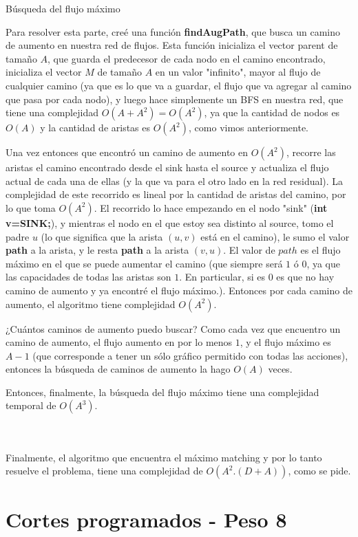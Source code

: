 \documentclass[a4paper]{article}
\begin{document}
\begin{subsubsection}{Búsqueda del flujo máximo} 

Para resolver esta parte, creé una función \textbf{findAugPath}, que busca un camino de aumento en nuestra red de flujos. Esta función inicializa el vector parent de tamaño $A$, que guarda el predecesor de cada nodo en el camino encontrado, inicializa el vector $M$ de tamaño $A$ en un valor "infinito", mayor al flujo de cualquier camino (ya que es lo que va a guardar, el flujo que va agregar al camino que pasa por cada nodo), y luego hace simplemente un BFS en nuestra red, que tiene una complejidad $O(A+A^2)=O(A^2)$, ya que la cantidad de nodos es $O(A)$ y la cantidad de aristas es $O(A^2)$, como vimos anteriormente.

Una vez entonces que encontró un camino de aumento en $O(A^2)$, recorre las aristas el camino encontrado desde el sink hasta el source y actualiza el flujo actual de cada una de ellas (y la que va para el otro lado en la red residual). La complejidad de este recorrido es lineal por la cantidad de aristas del camino, por lo que toma $O(A^2)$. El recorrido lo hace empezando en el nodo "sink" (\textbf{int v=SINK;}), y mientras el nodo en el que estoy sea distinto al source, tomo el padre $u$ (lo que significa que la arista $(u, v)$ está en el camino), le sumo el valor \textbf{path} a la arista, y le resta \textbf{path} a la arista $(v, u)$. El valor de $path$ es el flujo máximo en el que se puede aumentar el camino (que siempre será $1$ ó $0$, ya que las capacidades de todas las aristas son $1$. En particular, si es $0$ es que no hay camino de aumento y ya encontré el flujo máximo.).
Entonces por cada camino de aumento, el algoritmo tiene complejidad $O(A^2)$.

¿Cuántos caminos de aumento puedo buscar? Como cada vez que encuentro un camino de aumento, el flujo aumento en por lo menos $1$, y el flujo máximo es $A-1$ (que corresponde a tener un sólo gráfico permitido con todas las acciones), entonces la búsqueda de caminos de aumento la hago $O(A)$ veces.

Entonces, finalmente, la búsqueda del flujo máximo tiene una complejidad temporal de $O(A^3)$.
\end{subsubsection}
\\
\\
Finalmente, el algoritmo que encuentra el máximo matching y por lo tanto resuelve el problema, tiene una complejidad de $O(A^2.(D+A))$, como se pide.

\pagebreak
\section{Cortes programados - Peso 8}
\end{document}
